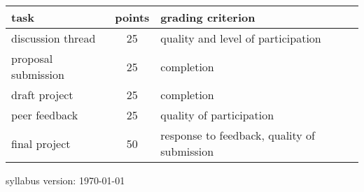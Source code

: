 \documentclass[12pt]{article}
\begin{document}
\begin{tabular}{l || c | l}
task & points & grading criterion \\
\hline
discussion thread & 25 & quality and level of participation\\
proposal submission & 25 & completion \\
draft project & 25 & completion \\
peer feedback & 25 & quality of participation \\
final project & 50 & response to feedback, quality of submission
\end{tabular}

 \scriptsize syllabus version: \today \normalsize
\end{document}
